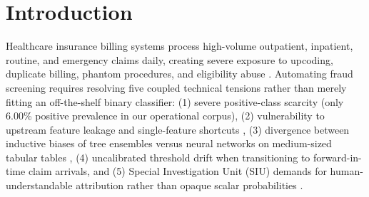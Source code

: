 \documentclass[12pt]{article}
\begin{document}
\newpage
\tableofcontents
\newpage
\listoffigures
\newpage
\listoftables

\newpage
\thispagestyle{empty}
\clearpage
\thispagestyle{empty}
\phantom{a}
\newpage

\section{Introduction}

Healthcare insurance billing systems process high-volume outpatient, inpatient, routine, and emergency claims daily, creating severe exposure to upcoding, duplicate billing, phantom procedures, and eligibility abuse \cite{dupreez2025fraud, bauder2017medicare}. Automating fraud screening requires resolving five coupled technical tensions rather than merely fitting an off-the-shelf binary classifier: (1) severe positive-class scarcity (only 6.00\% positive prevalence in our operational corpus), (2) vulnerability to upstream feature leakage and single-feature shortcuts \cite{kaufman2012leakage, geirhos2020shortcut}, (3) divergence between inductive biases of tree ensembles versus neural networks on medium-sized tabular tables \cite{grinsztajn2022tree}, (4) uncalibrated threshold drift when transitioning to forward-in-time claim arrivals, and (5) Special Investigation Unit (SIU) demands for human-understandable attribution rather than opaque scalar probabilities \cite{lundberg2017unified}.
\end{document}
